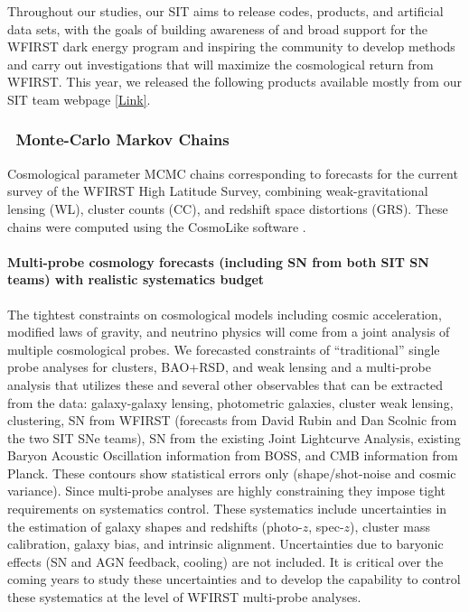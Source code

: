Throughout our studies, our SIT aims to release codes, products, and artificial data sets, with the goals of building awareness of and broad support for the WFIRST dark energy program and inspiring the community to develop methods and carry out investigations that will maximize the cosmological return from WFIRST. This year, we released the following products available mostly from our SIT team webpage \href{http://www.wfirst-hls-cosmology.org/products/}{[Link]}.

\subsubsection{\CoLi\ Monte-Carlo Markov Chains}

Cosmological parameter MCMC chains corresponding to forecasts for the current survey of the WFIRST High Latitude Survey, combining weak-gravitational lensing (WL), cluster counts (CC), and redshift space distortions (GRS). These chains were computed using the CosmoLike software \citep{Krause2016}.

\paragraph{Multi-probe cosmology forecasts (including SN from both SIT SN teams) with realistic systematics budget} The tightest constraints on cosmological models including cosmic acceleration, modified laws of gravity, and neutrino physics will come from a joint analysis of multiple cosmological probes. We forecasted constraints of “traditional” single probe analyses for clusters, BAO+RSD, and weak lensing and a multi-probe analysis that utilizes these and several other observables that can be extracted from the data: galaxy-galaxy lensing, photometric galaxies, cluster weak lensing, clustering, SN from WFIRST (forecasts from David Rubin and Dan Scolnic from the two SIT SNe teams), SN from the existing Joint Lightcurve Analysis, existing Baryon Acoustic Oscillation information from BOSS, and CMB information from Planck. These contours show statistical errors only (shape/shot-noise and cosmic variance). Since multi-probe analyses are highly constraining they impose tight requirements on systematics control. These systematics include uncertainties in the estimation of galaxy shapes and redshifts (photo-$z$, spec-$z$), cluster mass calibration, galaxy bias, and intrinsic alignment. Uncertainties due to baryonic effects (SN and AGN feedback, cooling) are not included. It is critical over the coming years to study these uncertainties and to develop the capability to control these systematics at the level of WFIRST multi-probe analyses.


